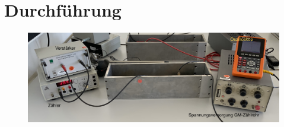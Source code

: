 \section{Durchführung}
\label{sec:durchführung}

\begin{figure}[H]
	\centering
	\includegraphics[width=0.9\linewidth]{content/grafik/aufbau.jpg}
	\caption{}
	\label{fig:aufbau}
\end{figure}

\newpage
